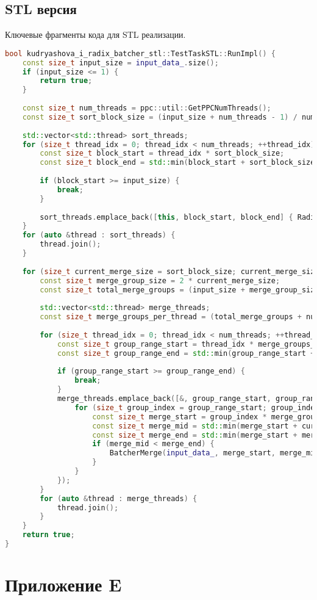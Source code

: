 \documentclass[12pt,a4paper]{extarticle}
\newcommand{\appendixsection}[1]{%
	\clearpage
	\section*{\centering Приложение #1}
	\addcontentsline{toc}{section}{Приложение #1}
}
\begin{document}
\subsection*{STL версия}
Ключевые фрагменты кода для STL реализации.
\begin{lstlisting}[language=C++]
bool kudryashova_i_radix_batcher_stl::TestTaskSTL::RunImpl() {
	const size_t input_size = input_data_.size();
	if (input_size <= 1) {
		return true;
	}
	
	const size_t num_threads = ppc::util::GetPPCNumThreads();
	const size_t sort_block_size = (input_size + num_threads - 1) / num_threads;
	
	std::vector<std::thread> sort_threads;
	for (size_t thread_idx = 0; thread_idx < num_threads; ++thread_idx) {
		const size_t block_start = thread_idx * sort_block_size;
		const size_t block_end = std::min(block_start + sort_block_size, input_size);
		
		if (block_start >= input_size) {
			break;
		}
		
		sort_threads.emplace_back([this, block_start, block_end] { RadixDoubleSort(input_data_, block_start, block_end); });
	}
	for (auto &thread : sort_threads) {
		thread.join();
	}
	
	for (size_t current_merge_size = sort_block_size; current_merge_size < input_size; current_merge_size *= 2) {
		const size_t merge_group_size = 2 * current_merge_size;
		const size_t total_merge_groups = (input_size + merge_group_size - 1) / merge_group_size;
		
		std::vector<std::thread> merge_threads;
		const size_t merge_groups_per_thread = (total_merge_groups + num_threads - 1) / num_threads;
		
		for (size_t thread_idx = 0; thread_idx < num_threads; ++thread_idx) {
			const size_t group_range_start = thread_idx * merge_groups_per_thread;
			const size_t group_range_end = std::min(group_range_start + merge_groups_per_thread, total_merge_groups);
			
			if (group_range_start >= group_range_end) {
				break;
			}
			merge_threads.emplace_back([&, group_range_start, group_range_end, current_merge_size, merge_group_size] {
				for (size_t group_index = group_range_start; group_index < group_range_end; ++group_index) {
					const size_t merge_start = group_index * merge_group_size;
					const size_t merge_mid = std::min(merge_start + current_merge_size, input_size);
					const size_t merge_end = std::min(merge_start + merge_group_size, input_size);
					if (merge_mid < merge_end) {
						BatcherMerge(input_data_, merge_start, merge_mid, merge_end);
					}
				}
			});
		}
		for (auto &thread : merge_threads) {
			thread.join();
		}
	}
	return true;
}


\end{lstlisting}
\appendixsection{E}
\end{document}
